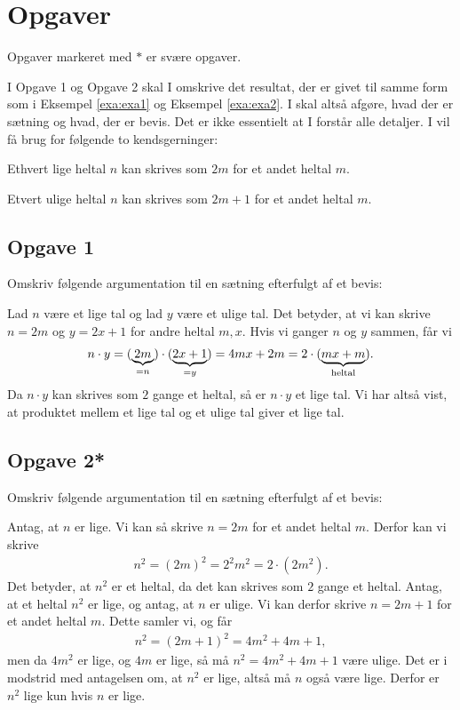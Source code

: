 \section*{Opgaver}
Opgaver markeret med $*$ er svære opgaver.

I Opgave 1 og Opgave 2 skal I omskrive det resultat, der er givet til samme form som i Eksempel \ref{exa:exa1} og Eksempel \ref{exa:exa2}. I skal altså afgøre, hvad der er sætning og hvad, der er bevis. Det er ikke essentielt at I forstår alle detaljer. I vil få brug for følgende to kendsgerninger:

Ethvert lige heltal $n$ kan skrives som $2m$ for et andet heltal $m$.

Etvert ulige heltal $n$ kan skrives som $2m+1$ for et andet heltal $m$.
\subsection*{Opgave 1}
Omskriv følgende argumentation til en sætning efterfulgt af et bevis:


Lad $n$ være et lige tal og lad $y$ være et ulige tal. Det betyder, at vi kan skrive $n = 2m$ og $y = 2x+1$ for andre heltal $m,x$. Hvis vi ganger $n$ og $y$ sammen, får vi
\begin{align*}
n\cdot y = (\underbrace{2m}_{=n})\cdot (\underbrace{2x+1}_{=y}) = 4mx+2m = 2\cdot(\underbrace{mx+m}_{\textnormal{heltal}}).
\end{align*}
Da $n\cdot y$ kan skrives som $2$ gange et heltal, så er $n\cdot y$ et lige tal. Vi har altså vist, at produktet mellem et lige tal og et ulige tal giver et lige tal.
\subsection*{Opgave 2*}
Omskriv følgende argumentation til en sætning efterfulgt af et bevis:


Antag, at $n$ er lige. Vi kan så skrive $n = 2m$ for et andet heltal $m$. Derfor kan vi skrive
\begin{align*}
n^2 = (2m)^2 = 2^2m^2 = 2\cdot(2m^2).
\end{align*}
Det betyder, at $n^2$ er et heltal, da det kan skrives som $2$ gange et heltal. 
Antag, at et heltal $n^2$ er lige, og antag, at $n$ er ulige. Vi kan derfor skrive $n = 2m + 1$ for et andet heltal $m$. Dette samler vi, og får 
\begin{align*}
n^2 = (2m+1)^2 = 4m^2+4m+1,
\end{align*}
men da $4m^2$ er lige, og $4m$ er lige, så må  $n^2 = 4m^2+4m+1$ være ulige. Det er i modstrid med antagelsen om, at $n^2$ er lige, altså må $n$ også være lige. Derfor er $n^2$ lige kun hvis $n$ er lige. 

